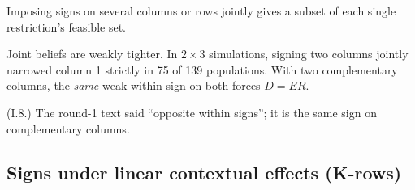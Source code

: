 \begin{result}
 Imposing signs on several columns or rows jointly gives a subset
of each single restriction's feasible set.
\end{result}
\begin{plain}
Joint beliefs are weakly tighter. In $2\times3$ simulations, signing two columns
jointly narrowed column 1 strictly in 75 of 139 populations. With two
complementary columns, the \emph{same} weak within sign on both forces $D=ER$.
\end{plain}
\begin{revnote}(I.8.) The round-1 text said ``opposite within signs''; it is the same sign on complementary columns.\end{revnote}

\subsection{Signs under linear contextual effects (K-rows)}


